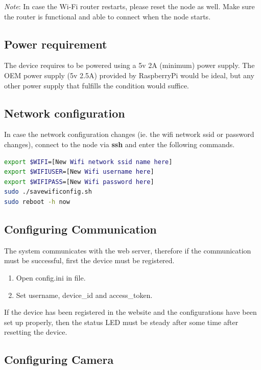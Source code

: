 \documentclass{report}
\begin{document}
\emph{Note}: In case the Wi-Fi router restarts, please reset the node as well. Make sure the router is functional and able to connect when the node starts.

\subsection{Power requirement}  %

The device requires to be powered using a 5v 2A (minimum) power supply. The OEM power supply (5v 2.5A) provided by RaspberryPi would be ideal, but any other power supply that fulfills the condition would suffice.

\subsection{Network configuration}

In case the network configuration changes (ie. the wifi network ssid or password changes), connect to the node via \textbf{ssh} and enter the following commands.
\begin{lstlisting}[language=bash]
export $WIFI=[New Wifi network ssid name here]
export $WIFIUSER=[New Wifi username here]
export $WIFIPASS=[New Wifi password here]
sudo ./savewificonfig.sh
sudo reboot -h now
\end{lstlisting}



\subsection{Configuring Communication}

The system communicates with the web server, therefore if the communication must be successful, first the device must be registered.

\begin{enumerate}

  \item Open config.ini in file.
  \item Set username, device\_id and access\_token.
  
\end{enumerate}

If the device has been registered in the website and the configurations have been set up properly, then the status LED must be steady after some time after resetting the device.

\subsection{Configuring Camera} %
\end{document}
